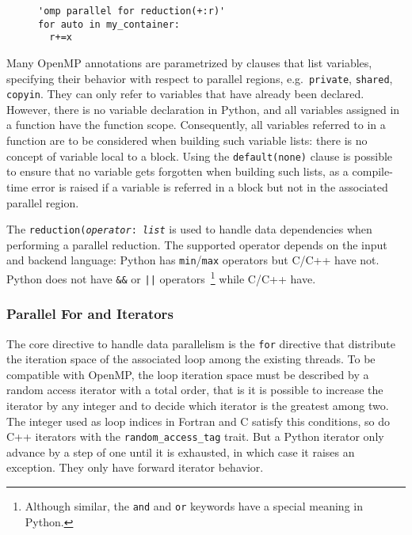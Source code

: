 \documentclass{llncs}
\begin{document}
\begin{figure}
    \begin{lstlisting}[label={lst:instruction-annotation}, caption={Parallel
    loop with reduction annotated with OpenMP directive.}]
'omp parallel for reduction(+:r)'
for auto in my_container:
  r+=x
  \end{lstlisting}
\end{figure}

Many OpenMP annotations are parametrized by clauses that list variables,
specifying their behavior with respect to parallel regions, e.g.\
\texttt{private}, \texttt{shared}, \texttt{copyin}. They can only refer to
variables that have already been declared. However, there is no variable
declaration in Python, and all variables assigned in a function have the
function scope. Consequently, all variables referred to in a function are to be
considered when building such variable lists: there is no concept of variable
local to a block. Using the \texttt{default(none)} clause is possible to ensure
that no variable gets forgotten when building such lists, as a compile-time
error is raised if a variable is referred in a block but not in the associated
parallel region.

The \texttt{reduction(\emph{operator}: \emph{list}} is used to handle data
dependencies when performing a parallel reduction. The supported operator
depends on the input and backend language: Python has \texttt{min}/\texttt{max} operators but
C/C++ have not. Python does not have \texttt{\&\&} or \texttt{||}
operators~\footnote{Although similar, the \texttt{and} and \texttt{or} keywords
have a special meaning in Python.} while C/C++ have.

\subsubsection{Parallel For and Iterators}

The core directive to handle data parallelism is the \texttt{for} directive that
distribute the iteration space of the associated loop among the existing
threads. To be compatible with OpenMP, the loop iteration space must be
described by a random access iterator with a total order, that is it is possible
to increase the iterator by any integer and to decide which iterator is the
greatest among two. The integer used as loop indices in Fortran and C satisfy
this conditions, so do C++ iterators with the \texttt{random\_access\_tag}
trait. But a Python iterator only advance by a step of one until it is
exhausted, in which case it raises an exception. They only have forward iterator
behavior.
\end{document}
